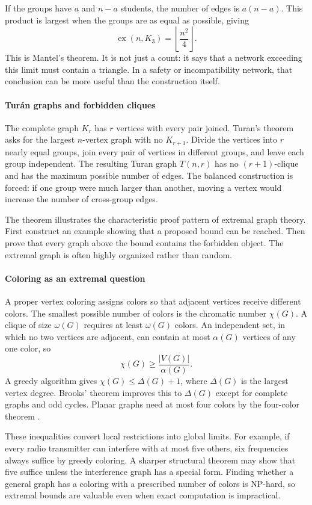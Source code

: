 If the groups have $a$ and $n-a$ students, the number of edges is $a(n-a)$. This product is largest when the groups are as equal as possible, giving
\[
\operatorname{ex}(n,K_3)=\left\lfloor\frac{n^2}{4}\right\rfloor.
\]
This is Mantel's theorem. It is not just a count: it says that a network exceeding this limit must contain a triangle. In a safety or incompatibility network, that conclusion can be more useful than the construction itself.

\paragraph{Turán graphs and forbidden cliques}
The complete graph $K_r$ has $r$ vertices with every pair joined. Turan's theorem asks for the largest $n$-vertex graph with no $K_{r+1}$. Divide the vertices into $r$ nearly equal groups, join every pair of vertices in different groups, and leave each group independent. The resulting Turan graph $T(n,r)$ has no $(r+1)$-clique and has the maximum possible number of edges. The balanced construction is forced: if one group were much larger than another, moving a vertex would increase the number of cross-group edges.

The theorem illustrates the characteristic proof pattern of extremal graph theory. First construct an example showing that a proposed bound can be reached. Then prove that every graph above the bound contains the forbidden object. The extremal graph is often highly organized rather than random.

\paragraph{Coloring as an extremal question}
A proper vertex coloring assigns colors so that adjacent vertices receive different colors. The smallest possible number of colors is the chromatic number $\chi(G)$. A clique of size $\omega(G)$ requires at least $\omega(G)$ colors. An independent set, in which no two vertices are adjacent, can contain at most $\alpha(G)$ vertices of any one color, so
\[
\chi(G)\geq \frac{|V(G)|}{\alpha(G)}.
\]
A greedy algorithm gives $\chi(G)\leq\Delta(G)+1$, where $\Delta(G)$ is the largest vertex degree. Brooks' theorem improves this to $\Delta(G)$ except for complete graphs and odd cycles. Planar graphs need at most four colors by the four-color theorem \cite{extremal_graph_theory_ref2,extremal_graph_theory_ref5}.

These inequalities convert local restrictions into global limits. For example, if every radio transmitter can interfere with at most five others, six frequencies always suffice by greedy coloring. A sharper structural theorem may show that five suffice unless the interference graph has a special form. Finding whether a general graph has a coloring with a prescribed number of colors is NP-hard, so extremal bounds are valuable even when exact computation is impractical.

